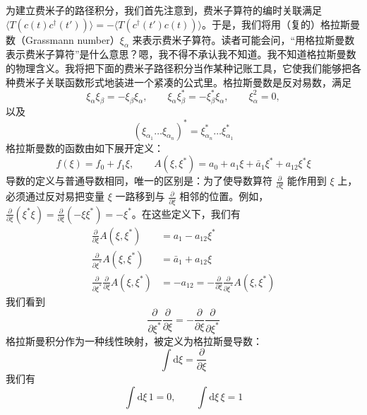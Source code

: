 为建立费米子的路径积分，我们首先注意到，费米子算符的编时关联满足 $\langle T(c(t)c^{\dagger}(t'))\rangle=-\langle T(c^{\dagger}(t')c(t))\rangle$。于是，我们将用（复的）格拉斯曼数（Grassmann number）$\xi_{\alpha}$ 来表示费米子算符。读者可能会问，``用格拉斯曼数表示费米子算符''是什么意思？嗯，我不得不承认我不知道。我不知道格拉斯曼数的物理含义。我将把下面的费米子路径积分当作某种记账工具，它使我们能够把各种费米子关联函数形式地装进一个紧凑的公式里。格拉斯曼数是反对易数，满足
\begin{equation*}
\xi_{\alpha}\xi_{\beta}=-\xi_{\beta}\xi_{\alpha},\qquad \xi_{\alpha}\xi_{\beta}^{*}=-\xi_{\beta}^{*}\xi_{\alpha},\qquad \xi_{\alpha}^{2}=0,
\end{equation*}
以及
\begin{equation*}
\left(\xi_{\alpha_{1}}\dots\xi_{\alpha_{n}}\right)^{*}=\xi_{\alpha_{n}}^{*}\dots\xi_{\alpha_{1}}^{*}
\end{equation*}
格拉斯曼数的函数由如下展开定义：
\begin{equation*}
f(\xi)=f_{0}+f_{1}\xi,\qquad A(\xi,\xi^{*})=a_{0}+a_{1}\xi+\bar{a}_{1}\xi^{*}+a_{12}\xi^{*}\xi
\end{equation*}
导数的定义与普通导数相同，唯一的区别是：为了使导数算符 $\frac{\partial}{\partial\xi}$ 能作用到 $\xi$ 上，必须通过反对易把变量 $\xi$ 一路移到与 $\frac{\partial}{\partial\xi}$ 相邻的位置。例如，$\frac{\partial}{\partial\xi}(\xi^{*}\xi)=\frac{\partial}{\partial\xi}(-\xi\xi^{*})=-\xi^{*}$。在这些定义下，我们有
\begin{align*}
\frac{\partial}{\partial\xi}A(\xi,\xi^{*}) &= a_{1}-a_{12}\xi^{*}\\
\frac{\partial}{\partial\xi^{*}}A(\xi,\xi^{*}) &= \bar{a}_{1}+a_{12}\xi\\
\frac{\partial}{\partial\xi^{*}}\frac{\partial}{\partial\xi}A(\xi,\xi^{*}) &=-a_{12}=-\frac{\partial}{\partial\xi}\frac{\partial}{\partial\xi^{*}}A(\xi,\xi^{*})
\end{align*}
我们看到
\begin{equation*}
\frac{\partial}{\partial\xi^{*}}\frac{\partial}{\partial\xi}=-\frac{\partial}{\partial\xi}\frac{\partial}{\partial\xi^{*}}
\end{equation*}
格拉斯曼积分作为一种线性映射，被定义为格拉斯曼导数：
\begin{equation*}
\int \mathrm{d}\xi=\frac{\partial}{\partial\xi}
\end{equation*}
我们有
\begin{equation*}
\int \mathrm{d}\xi\,1=0,\qquad \int \mathrm{d}\xi\,\xi=1
\end{equation*}
